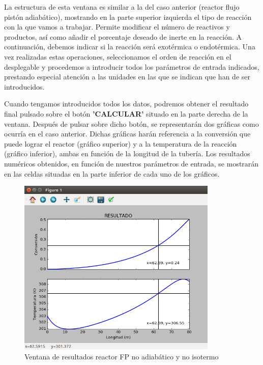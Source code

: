 La estructura de esta ventana es similar a la del caso anterior (reactor flujo pistón adiabático), mostrando en la parte superior izquierda el tipo de reacción con la que vamos a trabajar. Permite modificar el número de reactivos y productos, así como añadir el porcentaje deseado de inerte en la reacción. A continuación, debemos indicar si la reacción será exotérmica o endotérmica. Una vez realizadas estas operaciones, seleccionamos el orden de reacción en el desplegable y procedemos a introducir todos los parámetros de entrada indicados, prestando especial atención a las unidades en las que se indican que han de ser introducidos.

Cuando tengamos introducidos todos los datos, podremos obtener el resultado final pulsado sobre el botón \textbf{'CALCULAR'} situado en la parte derecha de la ventana. Después de pulsar sobre dicho botón, se representarán dos gráficas como ocurría en el caso anterior. Dichas gráficas harán referencia a la conversión que puede lograr el reactor (gráfico superior) y a la temperatura de la reacción (gráfico inferior), ambas en función de la longitud de la tubería. Los resultados numéricos obtenidos, en función de nuestros parámetros de entrada, se mostrarán en las celdas situadas en la parte inferior de cada uno de los gráficos.

\begin{figure}[h!]
	\begin{center}
		\includegraphics[width=0.85\textwidth]{./imagenes/reactor_fp/no_adi_no_iso2.png}\caption{Ventana de resultados reactor FP no adiabático y no isotermo}\label{fig:ventana_graficas_noadi_noiso}
	\end{center}
\end{figure}

